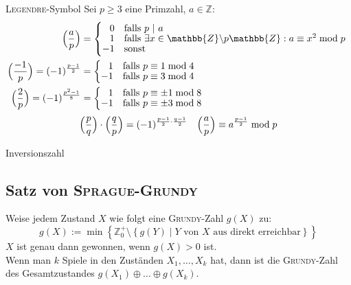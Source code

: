 \begin{algorithm}{\textsc{Legendre}-Symbol}
	Sei $p \geq 3$ eine Primzahl, $a \in \mathbb{Z}$:
	\begin{align*}
		\legendre{a}{p} &=
		\begin{cases*}
		\hphantom{-}0 & falls $p~\vert~a$ \\[-1ex]
		\hphantom{-}1 & falls $\exists x \in \mathbb{Z}\backslash p\mathbb{Z} : a \equiv x^2 \bmod p$ \\[-1ex]
		-1 & sonst
		\end{cases*} \\
		\legendre{-1}{p} = (-1)^{\frac{p - 1}{2}} &=
		\begin{cases*}
		\hphantom{-}1 & falls $p \equiv 1 \bmod 4$ \\[-1ex]
		-1 & falls $p \equiv 3 \bmod 4$
		\end{cases*} \\
		\legendre{2}{p} = (-1)^{\frac{p^2 - 1}{8}} &=
		\begin{cases*}
		\hphantom{-}1 & falls $p \equiv \pm 1 \bmod 8$ \\[-1ex]
		-1 & falls $p \equiv \pm 3 \bmod 8$
		\end{cases*}
	\end{align*}
	\begin{align*}
		\Bigl( \dfrac{p}{q} \Bigr) \cdot \Bigl( \dfrac{q}{p} \Bigr) = (-1)^{\frac{p - 1}{2} \cdot \frac{q - 1}{2}} &&
		\Bigl( \dfrac{a}{p} \Bigr) \equiv a^{\frac{p-1}{2}}\bmod p
	\end{align*}
\end{algorithm}

\begin{algorithm}{Inversionszahl}
\end{algorithm}

\subsection{Satz von \textsc{Sprague-Grundy}}
Weise jedem Zustand $X$ wie folgt eine \textsc{Grundy}-Zahl $g\left(X\right)$ zu:
\[
g\left(X\right) := \min\left\{
\mathbb{Z}_0^+ \setminus
\left\{g\left(Y\right) \mid Y \text{ von } X \text{ aus direkt erreichbar}\right\}
\right\} 
\]
$X$ ist genau dann gewonnen, wenn $g\left(X\right) > 0$ ist.\\
Wenn man $k$ Spiele in den Zuständen $X_1, \ldots, X_k$ hat, dann ist die \textsc{Grundy}-Zahl des Gesamtzustandes $g\left(X_1\right) \oplus \ldots \oplus g\left(X_k\right)$.

